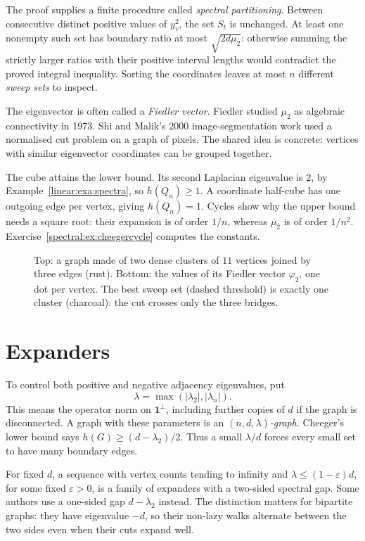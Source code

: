The proof supplies a finite procedure called \emph{spectral partitioning}. Between consecutive distinct positive values of $y_v^2$, the set $S_t$ is unchanged. At least one nonempty such set has boundary ratio at most $\sqrt{2d\mu_2}$: otherwise summing the strictly larger ratios with their positive interval lengths would contradict the proved integral inequality. Sorting the coordinates leaves at most $n$ different \emph{sweep sets} to inspect.

The eigenvector is often called a \emph{Fiedler vector}. Fiedler studied $\mu_2$ as algebraic connectivity in 1973. Shi and Malik's 2000 image-segmentation work used a normalised cut problem on a graph of pixels. The shared idea is concrete: vertices with similar eigenvector coordinates can be grouped together.

The cube attains the lower bound. Its second Laplacian eigenvalue is $2$, by Example~\ref{linear:exa:spectra}, so $h(Q_n)\ge1$. A coordinate half-cube has one outgoing edge per vertex, giving $h(Q_n)=1$. Cycles show why the upper bound needs a square root: their expansion is of order $1/n$, whereas $\mu_2$ is of order $1/n^2$. Exercise~\ref{spectral:ex:cheegercycle} computes the constants.

\begin{figure}[ht]
\centering
{}
\caption{Top: a graph made of two dense clusters of $11$ vertices joined by three edges (rust). Bottom: the values of its Fiedler vector $\varphi_2$, one dot per vertex. The best
sweep set (dashed threshold) is exactly one cluster (charcoal): the cut crosses only the three bridges.}
\label{spectral:fig:fiedler}
\end{figure}

\section{Expanders}

To control both positive and negative adjacency eigenvalues, put
\[
\lambda=\max(|\lambda_2|,|\lambda_n|).
\]
This means the operator norm on $\mathbf1^\perp$, including further copies of $d$ if the graph is disconnected. A graph with these parameters is an \emph{$(n,d,\lambda)$-graph}. Cheeger's lower bound says $h(G)\ge(d-\lambda_2)/2$. Thus a small $\lambda/d$ forces every small set to have many boundary edges.

For fixed $d$, a sequence with vertex counts tending to infinity and $\lambda\le(1-\varepsilon)d$, for some fixed $\varepsilon>0$, is a family of expanders with a two-sided spectral gap. Some authors use a one-sided gap $d-\lambda_2$ instead. The distinction matters for bipartite graphs: they have eigenvalue $-d$, so their non-lazy walks alternate between the two sides even when their cuts expand well.

